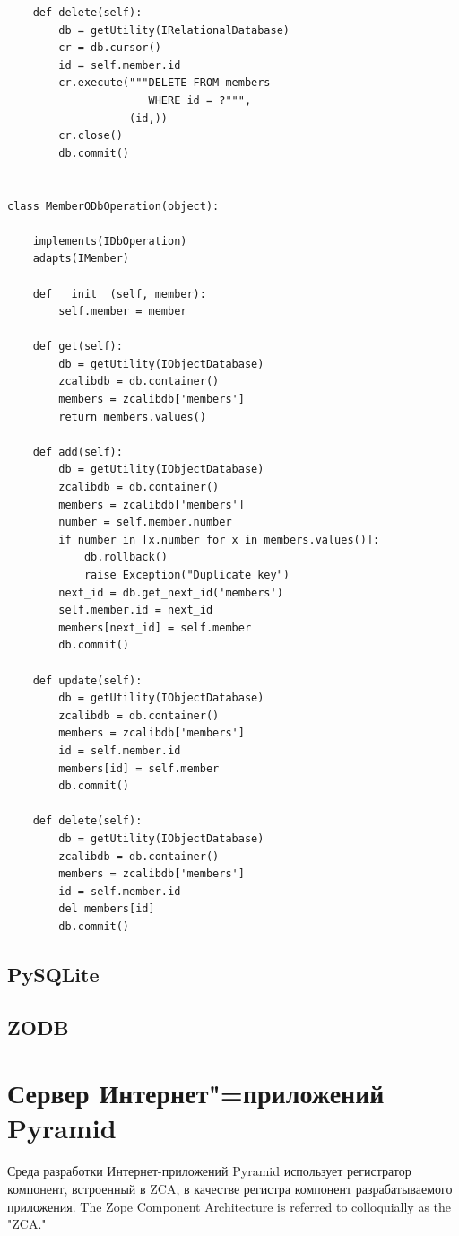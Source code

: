 \documentclass[a4paper,openany,twoside,final]{book}
\begin{document}
\begin{verbatim}
    def delete(self):
        db = getUtility(IRelationalDatabase)
        cr = db.cursor()
        id = self.member.id
        cr.execute("""DELETE FROM members
                      WHERE id = ?""",
                   (id,))
        cr.close()
        db.commit()


class MemberODbOperation(object):

    implements(IDbOperation)
    adapts(IMember)

    def __init__(self, member):
        self.member = member

    def get(self):
        db = getUtility(IObjectDatabase)
        zcalibdb = db.container()
        members = zcalibdb['members']
        return members.values()

    def add(self):
        db = getUtility(IObjectDatabase)
        zcalibdb = db.container()
        members = zcalibdb['members']
        number = self.member.number
        if number in [x.number for x in members.values()]:
            db.rollback()
            raise Exception("Duplicate key")
        next_id = db.get_next_id('members')
        self.member.id = next_id
        members[next_id] = self.member
        db.commit()

    def update(self):
        db = getUtility(IObjectDatabase)
        zcalibdb = db.container()
        members = zcalibdb['members']
        id = self.member.id
        members[id] = self.member
        db.commit()

    def delete(self):
        db = getUtility(IObjectDatabase)
        zcalibdb = db.container()
        members = zcalibdb['members']
        id = self.member.id
        del members[id]
        db.commit()
\end{verbatim}


\section{PySQLite%
  \label{pysqlite}%
}


\section{ZODB%
  \label{zodb}%
}

\chapter{Сервер Интернет"=приложений Pyramid}

Среда разработки Интернет-приложений Pyramid использует регистратор компонент, встроенный в ZCA, в качестве регистра компонент разрабатываемого приложения.  The Zope Component Architecture is referred to colloquially as the "ZCA."
\end{document}
